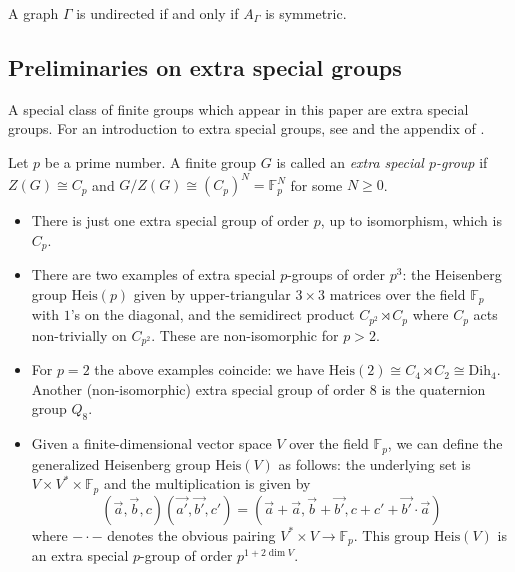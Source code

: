 \documentclass[ALCO]{cedram}
\newcommand{\F}{{\mathbb F}}
\begin{document}
\begin{rema}
 A graph $\Gamma$ is undirected if and only if $A_{\Gamma}$ is symmetric.
\end{rema}



\subsection{Preliminaries on extra special groups}\label{ssec:extra_special}
A special class of finite groups which appear in this paper are extra special groups. For an introduction to extra special groups, see \cite{Aschbacher} and the appendix of \cite{Diaconis}.

\begin{defi}
 Let $p$ be a prime number. A finite group $G$ is called an {\it extra special $p$-group} if $Z(G) \cong C_p$ and $G/Z(G) \cong (C_p)^N {= \F_p^N}$ for some $N\geq 0$. 
\end{defi}
\begin{exam}\label{ex:extra_special_groups}
\mbox{}
\begin{itemize}
 \item There is just one extra special group of order $p$, up to isomorphism, which is~$C_p$. 
 \item There are two examples of extra special $p$-groups of order $p^3$: the 
Heisenberg group $\mathrm{Heis}(p)$ given by upper-triangular $3\times 3$ matrices over the field 
$\mathbb{F}_p$ with $1$'s on the diagonal, and the semidirect product $C_{p^2} 
\rtimes C_p$ where $C_p$ acts non-trivially on $C_{p^2}$. These are non-isomorphic for $p>2$. 
 \item For $p=2$ the above examples coincide: we have $\mathrm{Heis}(2)\cong C_4 \rtimes C_2 \cong \mathrm{Dih}_4$. Another (non-isomorphic) extra special group of 
order $8$ is the quaternion group $Q_8$.
 \item Given a finite-dimensional vector space $V$ over the field $\F_p$, we can 
define the generalized Heisenberg group $\mathrm{Heis}(V)$ as follows: the underlying set 
is $V \times V^* \times \F_p$ and the multiplication is given by $$(\vec{a}, 
\vec{b}, c)(\vec{a'}, \vec{b'}, c') = (\vec{a} +\vec{a}, \vec{b}+\vec{b'}, c + 
c' + \vec{b'}\cdot\vec{a})$$ where $-\cdot -$ denotes the obvious pairing $V^* 
\times V \to \F_p$. This group $\mathrm{Heis}(V)$ is an extra special $p$-group of order 
$p^{1+2\dim V}$.
\end{itemize}

 
\end{exam}
\end{document}
